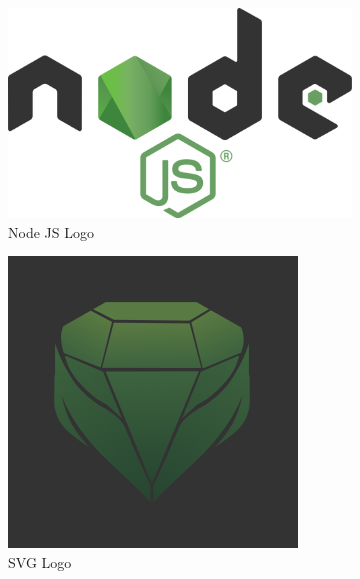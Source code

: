\documentclass[a4paper]{article}
\begin{document}
\begin{figure}[h!]
  \centering
  \begin{subfigure}[b]{0.3\linewidth}
    \includegraphics[width=\linewidth]{images/node-js-logo.png}
    \caption{Node JS Logo}
    \label{fig:node_logo}
  \end{subfigure}
   \begin{subfigure}[b]{0.3\linewidth}
    \includegraphics[width=\linewidth]{images/logo.png}
    \caption{SVG Logo}
    \label{fig:logo}
  \end{subfigure}
   \begin{subfigure}[b]{0.3\linewidth}

\end{subfigure}
\end{figure}
\end{document}
